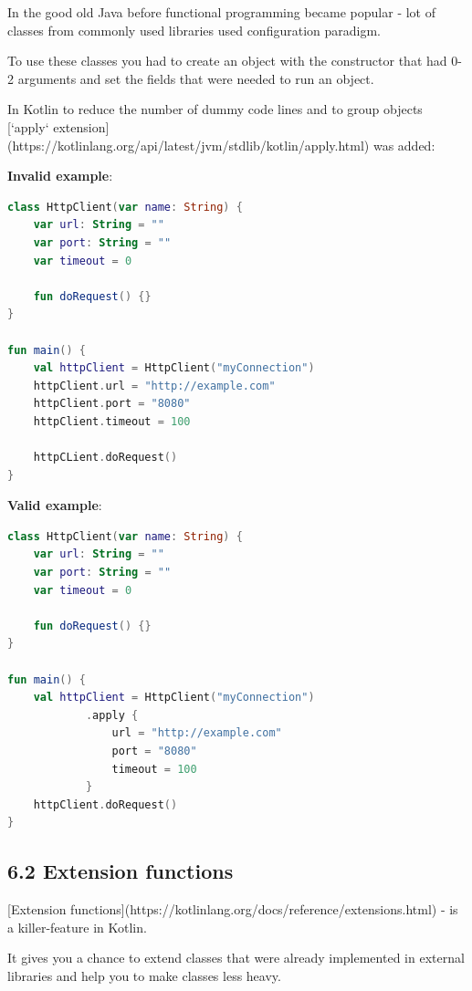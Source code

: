 {{{{In the good old Java before functional programming became popular - lot of classes from commonly used libraries used configuration paradigm.

To use these classes you had to create an object with the constructor that had 0-2 arguments and set the fields that were needed to run an object.

In Kotlin to reduce the number of dummy code lines and to group objects [`apply` extension](https://kotlinlang.org/api/latest/jvm/stdlib/kotlin/apply.html) was added:



\textbf{Invalid example}:

\begin{lstlisting}[language=Kotlin]
class HttpClient(var name: String) {
    var url: String = ""
    var port: String = ""
    var timeout = 0

    fun doRequest() {}
}

fun main() {
    val httpClient = HttpClient("myConnection")
    httpClient.url = "http://example.com"
    httpClient.port = "8080"
    httpClient.timeout = 100

    httpCLient.doRequest()
}

\end{lstlisting}


\textbf{Valid example}:

\begin{lstlisting}[language=Kotlin]
class HttpClient(var name: String) {
    var url: String = ""
    var port: String = ""
    var timeout = 0

    fun doRequest() {}
}

fun main() {
    val httpClient = HttpClient("myConnection")
            .apply {
                url = "http://example.com"
                port = "8080"
                timeout = 100
            }
    httpClient.doRequest()
}
\end{lstlisting}


\subsection*{\textbf{6.2 Extension functions}}

[Extension functions](https://kotlinlang.org/docs/reference/extensions.html) - is a killer-feature in Kotlin.

It gives you a chance to extend classes that were already implemented in external libraries and help you to make classes less heavy.

}}}}
